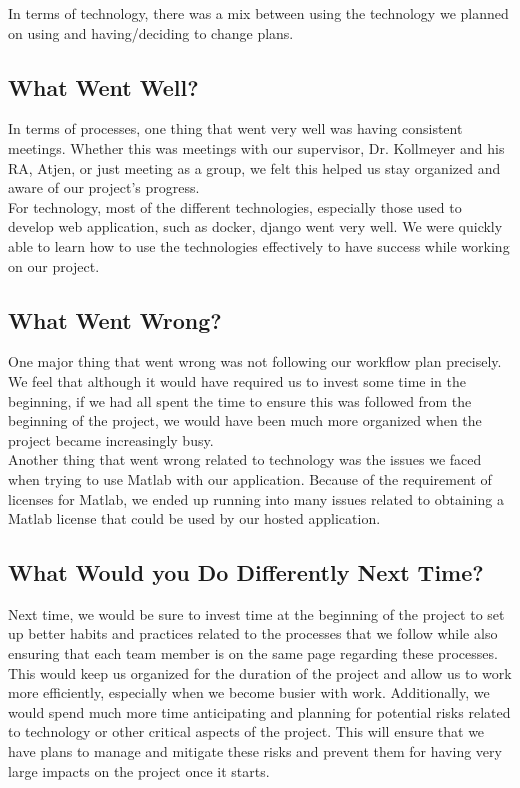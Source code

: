 \documentclass{article}
\begin{document}
In terms of technology, there was a mix between using the technology we planned on using and having/deciding to change plans. 

\subsection{What Went Well?}

In terms of processes, one thing that went very well was having consistent meetings. Whether this was meetings with our supervisor, Dr. Kollmeyer and his RA, Atjen, or just meeting as a group, we felt this helped us stay organized and aware of our project's progress. \\

For technology, most of the different technologies, especially those used to develop web application, such as docker, django went very well. We were quickly able to learn how to use the technologies effectively to have success while working on our project.

\subsection{What Went Wrong?}

One major thing that went wrong was not following our workflow plan precisely. We feel that although it would have required us to invest some time in the beginning, if we had all spent the time to ensure this was followed from the beginning of the project, we would have been much more organized when the project became increasingly busy.\\

Another thing that went wrong related to technology was the issues we faced when trying to use Matlab with our application. Because of the requirement of licenses for Matlab, we ended up running into many issues related to obtaining a Matlab license that could be used by our hosted application.

\subsection{What Would you Do Differently Next Time?}

Next time, we would be sure to invest time at the beginning of the project to set up better habits and practices related to the processes that we follow while also ensuring that each team member is on the same page regarding these processes. This would keep us organized for the duration of the project and allow us to work more efficiently, especially when we become busier with work. Additionally, we would spend much more time anticipating and planning for potential risks related to technology or other critical aspects of the project. This will ensure that we have plans to manage and mitigate these risks and prevent them for having very large impacts on the project once it starts.
\end{document}
